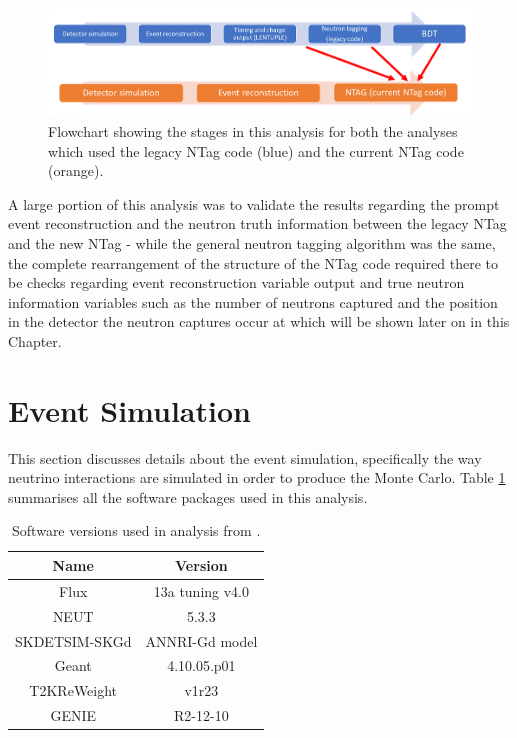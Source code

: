 \begin{figure}[htp]
    \includegraphics[width=\textwidth]{Figures/analysis_flowchart.png}
    \caption{Flowchart showing the stages in this analysis for both the analyses which used the legacy NTag code (blue) and the current NTag code (orange).}
\label{fig:analysis_flowchart}
\end{figure}

A large portion of this analysis was to validate the results regarding the prompt event reconstruction and the neutron truth information between the legacy NTag and the new NTag - while the general neutron tagging algorithm was the same, the complete rearrangement of the structure of the NTag code required there to be checks regarding event reconstruction variable output and true neutron information variables such as the number of neutrons captured and the position in the detector the neutron captures occur at which will be shown later on in this Chapter. 

\section{Event Simulation}

This section discusses details about the event simulation, specifically the way neutrino interactions are simulated in order to produce the Monte Carlo. Table \ref{table:software} summarises all the software packages used in this analysis. 


\begin{table}
\centering
    \begin{tabular}{||cc||}
        \hline Name & Version \\
        \hline Flux & 13a tuning v4.0 \\
        NEUT & 5.3.3 \\
        SKDETSIM-SKGd & ANNRI-Gd model \\
        Geant & 4.10.05.p01 \\
        T2KReWeight & v1r23 \\
        GENIE & R2-12-10 \\
        \hline
        \end{tabular}
\caption[Software versions used in analysis.]{Software versions used in analysis from \cite{tn415_fiacob}.}
\label{table:software}
\end{table}


